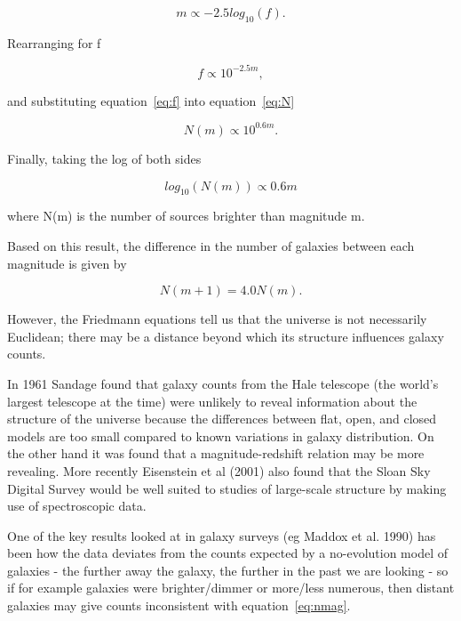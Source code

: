 \documentclass[a4paper,11pt,twoside]{article}
\begin{document}
\begin{equation}
m \propto -2.5log_{10}(f).
\end{equation}

Rearranging for f

\begin{equation}
\label{eq:f}
f \propto 10^{-2.5m},
\end{equation}

and substituting equation~\ref{eq:f} into equation~\ref{eq:N} 

\begin{equation}
N(m) \propto 10^{0.6m}.
\end{equation}

Finally, taking the log of both sides

\begin{equation}
\label{eq:nmag}
log_{10}(N(m)) \propto 0.6m
\end{equation}

where N(m) is the number of sources brighter than magnitude m.

Based on this result, the difference in the number of galaxies between
each magnitude is given by

\begin{equation}
N(m+1) = 4.0N(m).
\end{equation}

However, the Friedmann equations tell us that the 
universe is not necessarily Euclidean; there may be a distance 
beyond which its structure influences galaxy counts.

In 1961 Sandage \cite{sandage} found that galaxy counts from the Hale telescope 
(the world's largest telescope at the time\cite{hale}) were unlikely to 
reveal information about the structure of the universe because 
the differences between flat, open, and closed models are too small compared 
to known variations in galaxy distribution. On the other hand it was found 
that a magnitude-redshift relation may be more revealing. 
More recently Eisenstein et al (2001)\cite{eisen} also found that the Sloan 
Sky Digital Survey would be well suited to studies of large-scale structure 
by making use of spectroscopic data.

One of the key results looked at in galaxy surveys 
(eg Maddox et al. 1990)\cite{maddox} has been how the data deviates from 
the counts expected by a no-evolution model of galaxies - the further 
away the galaxy, the further in the past we are looking - so if for 
example galaxies were brighter/dimmer or more/less numerous, then 
distant galaxies may give counts inconsistent with equation~\ref{eq:nmag}.
\end{document}
